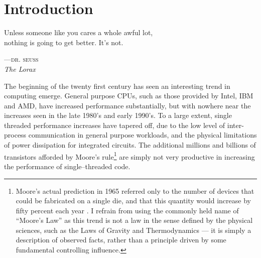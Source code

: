 
\chapter{Introduction}
\label{ch:introduction}

\epigraph{%
Unless someone like you cares a whole awful lot,\\
nothing is going to get better. It's not.}%
{\textsc{---dr. seuss}\\\textit{The Lorax}}




The beginning of the twenty first century has seen an interesting trend in
computing emerge. General purpose CPUs, such as those provided by Intel, IBM and
AMD, have increased performance substantially, but with nowhere near the
increases seen in the late 1980's and early 1990's. To a large extent, single
threaded performance increases have tapered off, due to the low level of
inter-process communication in general purpose workloads, and the physical
limitations of power dissipation for integrated circuits. The additional
millions and billions of transistors afforded by Moore's rule\footnote{Moore's
actual prediction in 1965 referred only to the number of devices that could be
fabricated on a single die, and that this quantity would increase by fifty
percent each year \cite{Moore:1965wc}. I refrain from using the commonly held
name of ``Moore's Law'' as this trend is not a law in the sense defined by the
physical sciences, such as the Laws of Gravity and Thermodynamics --- it is
simply a description of observed facts, rather than a principle driven by some
fundamental controlling influence.} are simply not very productive in increasing
the performance of single--threaded code.

